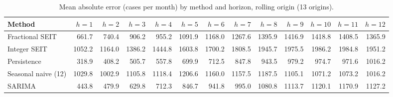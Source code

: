 \begin{table}[ht]
\centering
\small
\caption{Mean absolute error (cases per month) by method and horizon, rolling origin (13 origins).}
\label{tab:mae_h}
\begin{tabular}{lrrrrrrrrrrrr}
\hline
Method & $h=1$ & $h=2$ & $h=3$ & $h=4$ & $h=5$ & $h=6$ & $h=7$ & $h=8$ & $h=9$ & $h=10$ & $h=11$ & $h=12$ \\
\hline
Fractional SEIT & 661.7 & 740.4 & 906.2 & 955.2 & 1091.9 & 1168.0 & 1267.6 & 1395.9 & 1416.9 & 1418.8 & 1408.5 & 1365.9 \\
Integer SEIT & 1052.2 & 1164.0 & 1386.2 & 1444.8 & 1603.8 & 1700.2 & 1808.5 & 1945.7 & 1975.5 & 1986.2 & 1984.8 & 1951.2 \\
Persistence & 318.9 & 408.2 & 505.7 & 557.8 & 699.9 & 712.5 & 847.8 & 943.5 & 979.2 & 974.7 & 971.6 & 1016.2 \\
Seasonal naive (12) & 1029.8 & 1002.9 & 1105.8 & 1118.4 & 1206.6 & 1160.0 & 1157.5 & 1187.5 & 1105.1 & 1071.2 & 1073.2 & 1016.2 \\
SARIMA & 443.8 & 479.9 & 629.8 & 712.3 & 846.7 & 941.8 & 995.0 & 1080.8 & 1113.7 & 1120.1 & 1170.9 & 1127.2 \\
\hline
\end{tabular}
\end{table}
